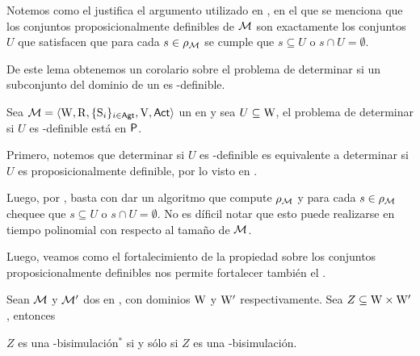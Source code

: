 Notemos como el  justifica el argumento utilizado en , en el que se menciona que los conjuntos proposicionalmente 
definibles de $\mathcal{M}$ son exactamente los conjuntos $U$ que satisfacen que para cada $s \in \rho_{\mathcal{M}}$ se cumple que 
$s \subseteq U$ o $s \cap U = \emptyset$.

De este lema obtenemos un corolario sobre el problema de determinar si un subconjunto del dominio de un \ults es \KHilogic-definible.

\begin{corolario}
    Sea $\mathcal{M}=\langle \mathrm{W},\mathrm{R},\{ \mathrm{S}_i \}_{i \in {\rm \sf Agt}},\mathrm{V},{\rm \sf Act} \rangle$ un \ults en \MFD y sea $U \subseteq \mathrm{W}$, el problema de determinar si $U$ es 
    \KHilogic-definible está en $\rm\textsf{P}$.
\end{corolario}

\begin{demostracion}

    Primero, notemos que determinar si $U$ es \KHilogic-definible es equivalente a determinar si $U$ es proposicionalmente definible, por lo visto en 
    .

    Luego, por , basta con dar un algoritmo que compute $\rho_{\mathcal{M}}$ y 
    para cada $s \in \rho_{\mathcal{M}}$ chequee que $s \subseteq U$ o $s \cap U = \emptyset$. No es díficil notar que esto 
    puede realizarse en tiempo polinomial con respecto al tamaño de $\mathcal{M}$.
\end{demostracion}

Luego, veamos como el fortalecimiento de la propiedad sobre los conjuntos proposicionalmente definibles nos permite fortalecer también el 
.

\begin{lema}\label{lema:old-implies-new-finite}
    Sean $\mathcal{M}$ y $\mathcal{M}'$ dos \ultss en \MFD, con dominios $\mathrm{W}$ y $\mathrm{W}'$ respectivamente. Sea $Z \subseteq \mathrm{W} \times \mathrm{W}'$, entonces 
    \begin{center}
        $Z$ es una \KHilogic-bisimulación$^*$ si y sólo si $Z$ es una \KHilogic-bisimulación.
    \end{center}
\end{lema}

